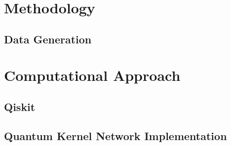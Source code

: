 \chapter{Methodology}\label{chap:methodology}

\section{Data Generation}\label{sec:DataGeneration}

\chapter{Computational Approach}\label{chap:computational}

\section{Qiskit}\label{sec:Qiskit}

\section{Quantum Kernel Network Implementation}\label{sec:QKNI}
